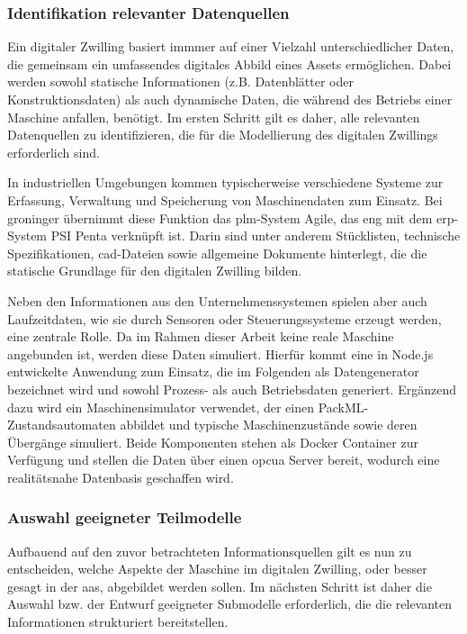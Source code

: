 \subsubsection{Identifikation relevanter Datenquellen}
Ein digitaler Zwilling basiert immmer auf einer Vielzahl unterschiedlicher Daten, die gemeinsam ein umfassendes digitales Abbild eines Assets ermöglichen. 
Dabei werden sowohl statische Informationen (z.B. Datenblätter oder Konstruktionsdaten) als auch dynamische Daten, die während des Betriebs einer Maschine anfallen, benötigt.
Im ersten Schritt gilt es daher, alle relevanten Datenquellen zu identifizieren, die für die Modellierung des digitalen Zwillings erforderlich sind.

In industriellen Umgebungen kommen typischerweise verschiedene Systeme zur Erfassung, Verwaltung und Speicherung von Maschinendaten zum Einsatz.
Bei groninger übernimmt diese Funktion das \acs{plm}-System Agile, das eng mit dem \acs{erp}-System PSI Penta verknüpft ist.
Darin sind unter anderem Stücklisten, technische Spezifikationen, \acs{cad}-Dateien sowie allgemeine Dokumente hinterlegt, die die statische Grundlage  für den digitalen Zwilling bilden.

Neben den Informationen aus den Unternehmenssystemen spielen aber auch Laufzeitdaten, wie sie durch Sensoren oder Steuerungssysteme erzeugt werden, eine zentrale Rolle.
Da im Rahmen dieser Arbeit keine reale Maschine angebunden ist, werden diese Daten simuliert.
Hierfür kommt eine in Node.js entwickelte Anwendung zum Einsatz, die im Folgenden als Datengenerator bezeichnet wird und sowohl Prozess- als auch Betriebsdaten generiert. 
Ergänzend dazu wird ein Maschinensimulator verwendet, der einen PackML-Zustandsautomaten abbildet und typische Maschinenzustände sowie deren Übergänge simuliert. 
Beide Komponenten stehen als Docker Container zur Verfügung und stellen die Daten über einen \acs{opcua} Server bereit, wodurch eine realitätsnahe Datenbasis geschaffen wird.
\subsubsection{Auswahl geeigneter Teilmodelle}
Aufbauend auf den zuvor betrachteten Informationsquellen gilt es nun zu entscheiden, welche Aspekte der Maschine im digitalen Zwilling, oder besser gesagt in der \acs{aas}, abgebildet werden sollen.
Im nächsten Schritt ist daher die Auswahl bzw. der Entwurf geeigneter Submodelle erforderlich, die die relevanten Informationen strukturiert bereitstellen.

